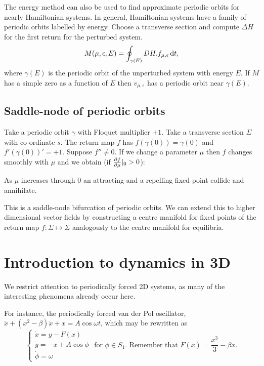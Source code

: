 \documentclass{notes}
\theoremstyle{plain}
\begin{document}
\vspace{1.5in}

The energy method can also be used to find approximate periodic orbits
for nearly Hamiltonian systems.  In general, Hamiltonian systems have
a family of periodic orbits labelled by energy.  Choose a transverse
section and compute $\Delta H$ for the first return for the perturbed system.
\[
M(\mu,\epsilon,E) = \oint_{\gamma(E)} DH.f_{\mu,\epsilon}\,\mathrm{d} t,
\]
where $\gamma(E)$ is the periodic orbit of the unperturbed system with energy
$E$.  If $M$ has a simple zero as a function of $E$ then
$v_{\mu,\epsilon}$ has a periodic orbit near $\gamma(E)$.

\section{Saddle-node of periodic orbits}

Take a periodic orbit $\gamma$ with Floquet multiplier $+1$.  Take a transverse
section $\Sigma$ with co-ordinate $s$.  The return map $f$ has
$f(\gamma(0)) = \gamma(0)$ and $f'(\gamma(0))'=+1$.  Suppose $f'' \neq 0$.
If we change a parameter $\mu$ then $f$ changes smoothly with $\mu$ and
we obtain (if $\frac{\partial f}{\partial \mu}|_0 > 0$):

\vspace{2in}

As $\mu$ increases through $0$ an attracting and a repelling fixed point
collide and annihilate.

\vspace{2in}

This is a saddle-node bifurcation of periodic orbits.  We can extend this
to higher dimensional vector fields by constructing a centre manifold
for fixed points of the return map $f \colon \Sigma \mapsto \Sigma$
analogously to the centre manifold for equilibria.

\chapter{Introduction to dynamics in 3D}

We restrict attention to periodically forced 2D systems, as many of the
interesting phenomena already occur here.

For instance, the periodically forced van der Pol oscillator,
$\ddot{x} + (x^2 - \beta) \dot{x} + x = A \cos \omega t$, which may be
rewritten as
\[
\begin{cases}
\dot{x} = y-F(x) \\
\dot{y} =-x + A \cos \phi \\
\dot{\phi} = \omega
\end{cases}\text{ for $\phi \in S_1$.  Remember that } F(x) = \frac{x^3}{3}
- \beta x.
\]
\end{document}
